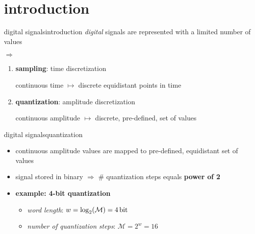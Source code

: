     \section[intro]{introduction}
        \begin{frame}{digital signals}{introduction}
            \textit{digital} signals are represented with a limited number of values
            
            \bigskip
            $\Rightarrow$
            \begin{enumerate}
                \item	\textbf{sampling}: time discretization
                
                continuous time $\mapsto$ discrete equidistant points in time 
                
                
                \smallskip
                \item	{\color{gtgold}\textbf{quantization}}: amplitude discretization
                
                continuous amplitude $\mapsto$ discrete, pre-defined, set of values
            \end{enumerate}
        \end{frame}
        
        \begin{frame}{digital signals}{quantization}
            \vspace{-3mm}
            \begin{itemize}
                \item   continuous amplitude values are mapped to pre-defined, equidistant set of values
                \item<1->   signal stored in binary $\Rightarrow$ \# quantization steps equals \textbf{power of 2}
                \smallskip
                \item<2->   \textbf{example: 4-bit quantization}
                    \begin{itemize}
                        \item	\textit{word length}: $w = \log_2(\mathcal{M}) = \unit[4]{bit}$
                        \item	\textit{number of quantization steps}: $\mathcal{M} = 2^w = 16$
                    \end{itemize}
            \end{itemize}
            
            \vspace{-3mm}
        \end{frame}	

